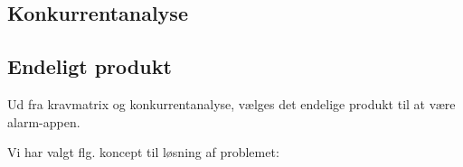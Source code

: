 \subsection{Konkurrentanalyse}

\subsection{Endeligt produkt}
Ud fra kravmatrix og konkurrentanalyse, vælges det endelige produkt til at være alarm-appen.


Vi har valgt flg. koncept til løsning af problemet:







